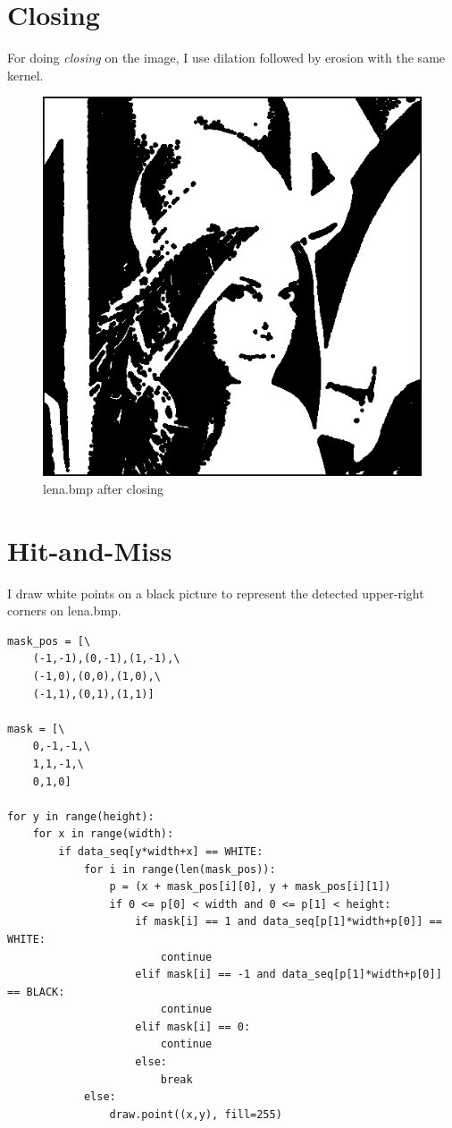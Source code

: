 \documentclass[14pt,a4paper]{extarticle}
\begin{document}
\section*{Closing}

For doing \textit{closing} on the image, I use dilation followed by erosion with the same kernel.

\begin{figure}[H]
\centering
\includegraphics[scale=0.6]{lena-closing.bmp}
\caption{lena.bmp after closing}
\label{fig:lena-closing.bmp}
\end{figure}

\section*{Hit-and-Miss}

I draw white points on a black picture to represent the detected upper-right corners on lena.bmp.

\begin{lstlisting}[caption=Hit-and-Miss]
mask_pos = [\
    (-1,-1),(0,-1),(1,-1),\
    (-1,0),(0,0),(1,0),\
    (-1,1),(0,1),(1,1)]

mask = [\
    0,-1,-1,\
    1,1,-1,\
    0,1,0]

for y in range(height):
    for x in range(width):
        if data_seq[y*width+x] == WHITE:
            for i in range(len(mask_pos)):
                p = (x + mask_pos[i][0], y + mask_pos[i][1])
                if 0 <= p[0] < width and 0 <= p[1] < height:
                    if mask[i] == 1 and data_seq[p[1]*width+p[0]] == WHITE:
                        continue
                    elif mask[i] == -1 and data_seq[p[1]*width+p[0]] == BLACK:
                        continue
                    elif mask[i] == 0:
                        continue
                    else:
                        break
            else:
                draw.point((x,y), fill=255)
\end{lstlisting}
\end{document}
